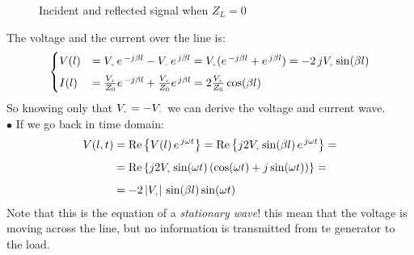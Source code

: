\begin{figure}[H]
    \begin{center}
    \end{center}
    \caption{Incident and reflected signal when $Z_L=0$}\label{fig:signal_with_Z_0}
\end{figure}
The voltage and the current over the line is:
\begin{equation}
    \begin{cases}
      V(l)&=V\bottomPlus\,e^{\,-j\beta l}-V\bottomMinus\,e^{\,j\beta l}=V\bottomPlus(e^{\,-j\beta l}+e^{\,j\beta l})=-2\,jV\bottomPlus\sin (\beta l)\\[5pt]
      I(l)&=\frac{V\bottomPlus}{Z_0}e^{\,-j\beta l}+\frac{V\bottomPlus}{Z_0}e^{\,j\beta l}=2\frac{V\bottomPlus}{Z_0}\cos (\beta l)
    \end{cases}
\end{equation}
So knowing only that $V\bottomPlus=-V\bottomMinus$ we can derive the voltage and current wave.\\
$\bullet$ If we go back in time domain:
\begin{align}
    \begin{split}
      V(l,t)&=\operatorname{Re}\left\{V(l)\,e^{\,j\omega t}\right\}=\operatorname{Re}\left\{j 2V\bottomPlus\sin (\beta l)\,e^{\,j\omega t}\right\}=\\[5pt]
      &=\operatorname{Re}\left\{j2V\bottomPlus\sin(\omega t)\,(\cos(\omega t)+j\sin(\omega t))\right\}=\\[5pt]
      &=-2\,|V\bottomPlus|\,\sin(\beta l)\sin(\omega t)
    \end{split}
\end{align}
Note that this is the equation of a \emph{stationary wave}! this mean that the voltage is moving across the line, but no information is transmitted from te generator to the load.\\
